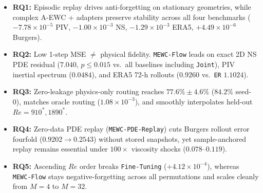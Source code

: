 \documentclass[11pt,a4paper]{article}
\begin{document}
\begin{itemize}
  \item \textbf{RQ1:} Episodic replay drives anti-forgetting on stationary geometries, while complex A-EWC + adapters preserve stability across all four benchmarks ($-7.78\times 10^{-5}$ PIV, $-1.00\times 10^{-3}$ NS, $-1.29\times 10^{-3}$ ERA5, $+4.49\times 10^{-6}$ Burgers).
  \item \textbf{RQ2:} Low 1-step MSE $\neq$ physical fidelity. \texttt{MEWC-Flow} leads on exact 2D NS PDE residual ($7.040$, $p\le 0.015$ vs.\ all baselines including \texttt{Joint}), PIV inertial spectrum ($0.0484$), and ERA5 72-h rollouts ($0.9260$ vs.\ \texttt{ER} $1.1024$).
  \item \textbf{RQ3:} Zero-leakage physics-only routing reaches $77.6\% \pm 4.6\%$ ($84.2\%$ seed-0), matches oracle routing ($1.08\times 10^{-3}$), and smoothly interpolates held-out $Re=910^*, 1890^*$.
  \item \textbf{RQ4:} Zero-data PDE replay (\texttt{MEWC-PDE-Replay}) cuts Burgers rollout error fourfold ($0.9202 \to 0.2543$) without stored snapshots, yet sample-anchored replay remains essential under $100\times$ viscosity shocks ($0.078$--$0.119$).
  \item \textbf{RQ5:} Ascending $Re$ order breaks \texttt{Fine-Tuning} ($+4.12\times 10^{-4}$), whereas \texttt{MEWC-Flow} stays negative-forgetting across all permutations and scales cleanly from $M=4$ to $M=32$.
\end{itemize}
\end{document}

